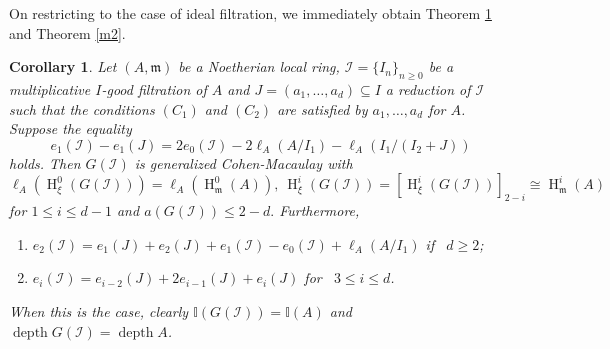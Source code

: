 \documentclass[11pt,reqno]{amsart}
\newtheorem{corollary}[theorem]{Corollary}
\theoremstyle{definition}
\newcommand{\m}{\mathfrak m}
\def\I{{\mathcal I}}
\DeclareMathOperator{\h}{H}
\DeclareMathOperator{\depth}{depth}
\numberwithin{equation}{section}
\begin{document}
On restricting to the case of ideal filtration, we immediately obtain Theorem \ref{Corollary 7.4} and Theorem \ref{m2}.
\begin{corollary}\label{Corollary 7.4}
    Let $(A,\m)$ be a Noetherian local ring, $\I=\{I_n\}_{n\geq 0}$ be a multiplicative $I$-good filtration of $A$ and $J=(a_1,\ldots,a_d)\subseteq I$  a reduction of $\I$  such that the conditions $(C_1)$ and $(C_2)$ are satisfied by $a_1,\ldots,a_d$ for $A$. Suppose the equality \begin{equation*}e_1(\I)-e_1(J)=2e_0(\I)-2\ell_A(A/I_1)-\ell_A(I_1/(I_2+J))
	\end{equation*}  holds. Then $G(\I)$ is generalized Cohen-Macaulay with $$\ell_A(\h^0_{\xi}(G(\I)))=\ell_A(\h^0_{\m}(A)),~ \h^i_{\xi}(G(\I))=[\h^i_{\xi}(G(\I))]_{2-i}\cong \h^i_{\m}(A)$$ for $1\leq i\leq d-1$ and $a(G(\I))\leq 2-d.$ Furthermore, 
	\begin{enumerate}
	 \item%
     $e_2(\I)=e_1(J)+e_2(J)+e_1(\I)-e_0(\I)+\ell_A(A/I_1)$ \mbox{if } $d\geq 2$;
	\item%
    $e_i(\I)=e_{i-2}(J)+2e_{i-1}(J)+e_i(J)$ \mbox{for } $3\leq i\leq d$. 
		\end{enumerate}
        When this is the case, clearly $\mathbb{I}(G(\I))=\mathbb{I}(A)$ and $\depth G(\I)=\depth A$.
\end{corollary}
\end{document}
